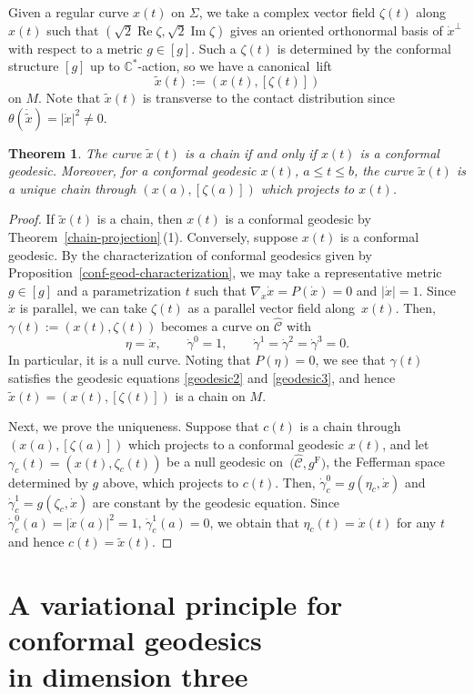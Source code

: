 \documentclass[pdftex]{sigma}
\renewcommand\th{\theta}
\newcommand{\wh}{\widehat}
\numberwithin{equation}{section}
\newtheorem{Theorem}{Theorem}[section]
\begin{document}
Given a regular curve $x(t)$ on $\Sigma$, we take a complex vector field $\zeta(t)$ along $x(t)$ such that $(\sqrt{2}\operatorname{Re}\zeta, \sqrt{2}\operatorname{Im}\zeta)$ gives an oriented orthonormal basis of $\dot x^\perp$ with respect to a metric ${g\in[g]}$. Such a $\zeta(t)$ is determined by the conformal structure $[g]$ up to $\mathbb{C}^*$-action, so we have a canonical~lift
\[
\tilde x(t):=(x(t), [\zeta(t)])
\]
on $M$. Note that $\tilde x(t)$ is transverse to the contact distribution since
$\th(\dot{\tilde x})=|\dot x|^2\neq 0$.
\begin{Theorem} \label{canonical-lift}
The curve $\tilde x(t)$ is a chain if and only if $x(t)$ is a conformal geodesic. Moreover, for a conformal geodesic $x(t)$, $a\le t\le b$, the curve $\tilde x(t)$ is a unique chain through $(x(a), [\zeta(a)])$ which projects to $x(t)$.
\end{Theorem}
\begin{proof}
If $\tilde x(t)$ is a chain, then $x(t)$ is a conformal geodesic by Theorem~\ref{chain-projection}\,(1). Conversely, suppose $x(t)$ is a conformal geodesic. By the characterization of conformal geodesics given by Proposition~\ref{conf-geod-characterization}, we may take a representative metric $g\in[g]$ and a parametrization $t$ such that $\nabla_{\dot x}\dot x=P(\dot x)=0$ and $|\dot x|=1$. Since $\dot x$ is parallel, we can take
$\zeta(t)$ as a parallel vector field along~$x(t)$.
Then, $\gamma(t):=(x(t), \zeta(t))$ becomes a curve on $\wh{\mathcal{C}}$ with
\[
\eta=\dot x, \qquad \dot\gamma^0=1, \qquad \dot\gamma^1=\dot\gamma^2=\dot\gamma^3=0.
\]
In particular, it is a null curve. Noting that $P(\eta)=0$, we see that $\gamma(t)$ satisfies the geodesic equations \eqref{geodesic2} and \eqref{geodesic3}, and hence $\tilde x(t)=(x(t), [\zeta(t)])$ is a chain on $M$.

Next, we prove the uniqueness. Suppose that $c (t)$ is a chain through $(x(a), [\zeta(a)])$ which projects to a conformal geodesic $x(t)$, and let $\gamma_c(t)=(x(t), \zeta_c(t))$ be a null geodesic on~${\bigl(\wh{\mathcal{C}}, g^{\mathrm{F}}\bigr)}$, the Fefferman space determined by $g$ above, which projects to $c(t)$. Then, $\dot\gamma_c^0=g(\eta_c, \dot x)$ and $\dot\gamma_c^1=g(\zeta_c, \dot x)$ are constant by the geodesic equation. Since $\dot\gamma_c^0(a)=|\dot x(a)|^2=1$, $\dot\gamma_c^1(a)=0$, we obtain that $\eta_c(t)=\dot x(t)$ for any $t$ and hence $c(t)=\tilde x(t)$.
\end{proof}

\section[A variational principle for conformal geodesics in dimension three]{A variational principle for conformal geodesics\\ in dimension three}\label{variational-principle}
\end{document}
